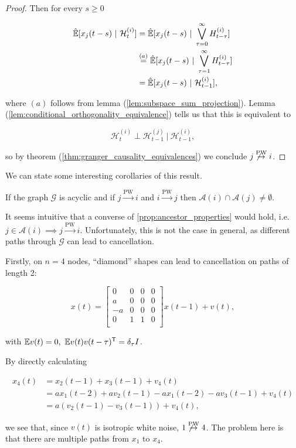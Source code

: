 \documentclass[12pt]{article}
\def\pwgc{\overset{\text{PW}}{\rightarrow}}  %
\def\gcg{\mathcal{G}}  %
\def\H{\mathcal{H}}  %
\newcommand{\linE}[2]{\hat{\E}[#1\ |\ #2]}  %
\newcommand{\anc}[1]{\mathcal{A}(#1)}  %
\begin{document}
\begin{proof}
  Then for every $s \ge 0$

  \begin{align*}
    \linE{x_j(t - s)}{\H_t^{(i)}} &= \linE{x_j(t - s)}{\bigvee_{\tau = 0}^\infty H_{t - \tau}^{(i)}}\\
    &\overset{(a)}{=} \linE{x_j(t - s)}{\bigvee_{\tau = 1}^\infty H_{t - \tau}^{(i)}}\\
    &= \linE{x_j(t - s)}{\H_{t - 1}^{(i)}},
  \end{align*}

  where $(a)$ follows from lemma (\ref{lem:subspace_sum_projection}).  Lemma (\ref{lem:conditional_orthogonality_equivalence}) tells us that this is equivalent to

  \begin{equation*}
    \H_t^{(i)} \perp \H_{t - 1}^{(j)}\ |\ \H_{t - 1}^{(i)},
  \end{equation*}

  so by theorem (\ref{thm:granger_causality_equivalences}) we conclude $j \not\pwgc i$.
\end{proof}

We can state some interesting corollaries of this result.

\begin{corollary}
  If the graph $\gcg$ is acyclic and if $j \pwgc i$ and $i \pwgc j$ then $\anc{i} \cap \anc{j} \ne \emptyset$.
\end{corollary}

It seems intuitive that a converse of \ref{prop:ancestor_properties}
would hold, i.e. $j \in \anc{i} \implies j \pwgc i$.  Unfortunately,
this is not the case in general, as different paths through $\gcg$ can
lead to cancellation.

\begin{example}
  Firstly, on $n = 4$ nodes, ``diamond'' shapes can lead to cancellation on paths of length 2:

\begin{equation*}
  x(t) =
  \left[
    \begin{array}{cccc}
      0 & 0 & 0 & 0\\
      a & 0 & 0 & 0\\
      -a & 0 & 0 & 0\\
      0 & 1 & 1 & 0\\
    \end{array}
  \right] x(t - 1) + v(t),
\end{equation*}

with $\mathbb{E} v(t) = 0,\ \mathbb{E} v(t)v(t - \tau)^{\mathsf{T}} = \delta_\tau I$.

By directly calculating

\begin{align*}
  x_4(t) &= x_2(t - 1) + x_3(t - 1) + v_4(t)\\
         &= ax_1(t - 2) + av_2(t - 1) - ax_1(t - 2) -av_3(t - 1) + v_4(t)\\
         &= a(v_2(t - 1) - v_3(t - 1)) + v_4(t),
\end{align*}

we see that, since $v(t)$ is isotropic white noise, $1 \not\pwgc 4$.  The problem here is that there are multiple paths from $x_1$ to $x_4$.
\end{example}
\end{document}
